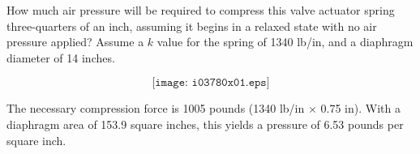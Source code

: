 

How much air pressure will be required to compress this valve actuator spring three-quarters of an inch, assuming it begins in a relaxed state with no air pressure applied?  Assume a $k$ value for the spring of 1340 lb/in, and a diaphragm diameter of 14 inches.

$$\texttt{[image: i03780x01.eps]}$$







The necessary compression force is 1005 pounds (1340 lb/in $\times$ 0.75 in).  With a diaphragm area of 153.9 square inches, this yields a pressure of 6.53 pounds per square inch.











